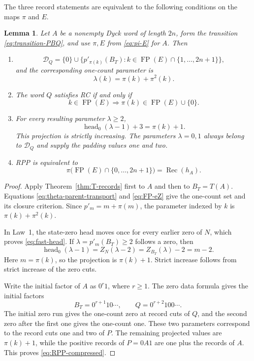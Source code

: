 \documentclass[11pt]{article}
\newtheorem{lemma}[theorem]{Lemma}
\theoremstyle{definition}
\theoremstyle{remark}
\DeclareMathOperator{\Rec}{Rec}
\DeclareMathOperator{\FP}{FP}
\begin{document}
The three record statements are equivalent to the following conditions on the
maps $\pi$ and $E$.
\begin{lemma}
\label{lem:compressed-records}
Let \(A\) be a nonempty Dyck word of length \(2n\), form the transition
\eqref{eq:transition-PBQ}, and use \(\pi,E\) from \eqref{eq:pi-E} for \(A\).
Then
\begin{enumerate}[label=\textup{(\roman*)}]
\item
\[
 \mathcal D_Q=\{0\}\cup
 \{p'_{\pi(k)}(B_T):k\in\FP(E)\cap\{1,\ldots,2n+1\}\},
\]
and the corresponding one-count parameter is
\[
 \lambda(k)=\pi(k)+\pi^2(k).
\]
\item The word \(Q\) satisfies RC if and only if
\[
 k\in\FP(E)\Longrightarrow\pi(k)\in\FP(E)\cup\{0\}.
\]
\item For every resulting parameter \(\lambda\geq2\),
\[
 \operatorname{head}_0(\lambda-1)+3=\pi(k)+1.
\]
This projection is strictly increasing.  The parameters \(\lambda=0,1\) always belong
to \(\mathcal D_Q\) and supply the padding values one and two.
\item RPP is equivalent to
\begin{equation}
\label{eq:RPP-compressed}
 \pi\bigl(\FP(E)\cap\{0,\ldots,2n+1\}\bigr)=\Rec(h_A).
\end{equation}
\end{enumerate}
\end{lemma}

\begin{proof}
Apply Theorem~\ref{thm:T-records} first to \(A\) and then to \(B_T=T(A)\).
Equations \eqref{eq:theta-parent-transport} and \eqref{eq:FP-eZ} give the
one-count set and its closure criterion.  Since
\(p'_m=m+\pi(m)\), the parameter indexed by \(k\) is
\(\pi(k)+\pi^2(k)\).

In Law~1, the state-zero head moves once for every earlier zero of \(N\),
which proves \eqref{eq:fast-head}.  If \(\lambda=p'_m(B_T)\geq2\) follows a zero,
then
\[
 \operatorname{head}_0(\lambda-1)
 =Z_N(\lambda-2)=Z_{B_T}(\lambda)-2=m-2.
\]
Here \(m=\pi(k)\), so the projection is \(\pi(k)+1\).  Strict increase
follows from strict increase of the zero cuts.

Write the initial factor of \(A\) as \(0^r1\), where \(r\geq1\).  The zero
data formula gives the initial factors
\[
 B_T=0^{r+1}10\cdots,
 \qquad
 Q=0^{r+2}100\cdots.
\]
The initial zero run gives the one-count zero at record cuts of \(Q\), and
the second zero after the first one gives the one-count one.  These two
parameters correspond to the record cuts one and two of \(P\).  The remaining projected
values are \(\pi(k)+1\), while the positive records of \(P=0A1\) are one plus
the records of \(A\).  This proves \eqref{eq:RPP-compressed}.
\end{proof}
\end{document}
